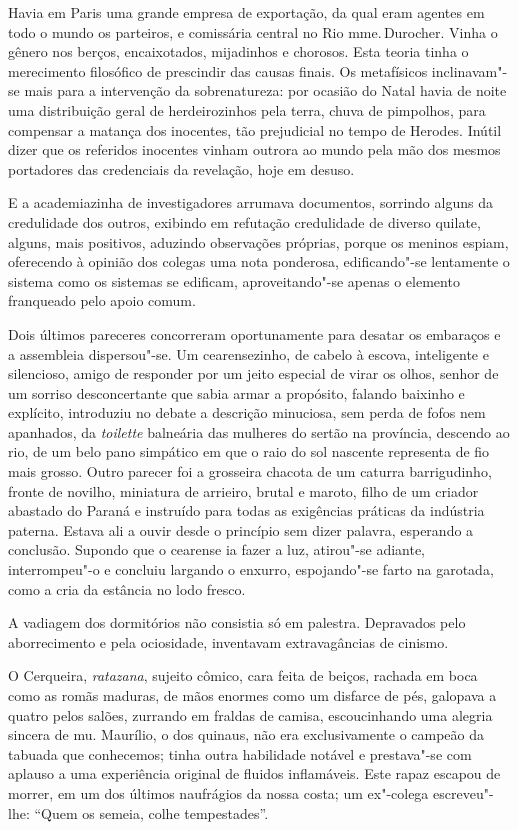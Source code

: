 Havia em Paris uma grande empresa de exportação, da qual eram agentes
em todo o mundo os parteiros, e comissária central no Rio mme.\,Durocher. 
Vinha o gênero nos berços, encaixotados, mijadinhos e chorosos. Esta teoria 
tinha o merecimento filosófico de prescindir das causas finais. Os metafísicos
inclinavam"-se mais para a intervenção da sobrenatureza: por ocasião
do Natal havia de noite uma distribuição geral de herdeirozinhos pela
terra, chuva de pimpolhos, para compensar a matança dos inocentes, tão
prejudicial no tempo de Herodes. Inútil dizer que os referidos
inocentes vinham outrora ao mundo pela mão dos mesmos portadores das
credenciais da revelação, hoje em desuso. 

E a academiazinha de
investigadores arrumava documentos, sorrindo alguns da credulidade dos
outros, exibindo em refutação credulidade de diverso quilate, alguns,
mais positivos, aduzindo observações próprias, porque os meninos
espiam, oferecendo à opinião dos colegas uma nota ponderosa,
edificando"-se lentamente o sistema como os sistemas se edificam,
aproveitando"-se apenas o elemento franqueado pelo apoio comum. 

Dois últimos pareceres concorreram oportunamente para desatar os embaraços e
a assembleia dispersou"-se. Um cearensezinho, de cabelo à escova,
inteligente e silencioso, amigo de responder por um jeito especial de
virar os olhos, senhor de um sorriso desconcertante que sabia armar a
propósito, falando baixinho e explícito, introduziu no debate a
descrição minuciosa, sem perda de fofos nem apanhados, da \textit{toilette}
balneária das mulheres do sertão na província, descendo ao rio, de um
belo pano simpático em que o raio do sol nascente representa de fio
mais grosso. Outro parecer foi a grosseira chacota de um caturra
barrigudinho, fronte de novilho, miniatura de arrieiro, brutal e
maroto, filho de um criador abastado do Paraná e instruído para todas
as exigências práticas da indústria paterna. Estava ali a ouvir desde o
princípio sem dizer palavra, esperando a conclusão. Supondo que o
cearense ia fazer a luz, atirou"-se adiante, interrompeu"-o e
concluiu largando o enxurro, espojando"-se farto na garotada, como a
cria da estância no lodo fresco. 

A vadiagem dos dormitórios não
consistia só em palestra. Depravados pelo aborrecimento e pela
ociosidade, inventavam extravagâncias de cinismo. 

O Cerqueira, \textit{ratazana}, sujeito cômico, cara feita de beiços, rachada em boca como as
romãs maduras, de mãos enormes como um disfarce de pés, galopava a
quatro pelos salões, zurrando em fraldas de camisa, escoucinhando uma
alegria sincera de mu. Maurílio, o dos quinaus, não era exclusivamente
o campeão da tabuada que conhecemos; tinha outra habilidade notável e
prestava"-se com aplauso a uma experiência original de fluidos
inflamáveis. Este rapaz escapou de morrer, em um dos últimos naufrágios
da nossa costa; um ex"-colega escreveu"-lhe: ``Quem os semeia, colhe
tempestades''. 

